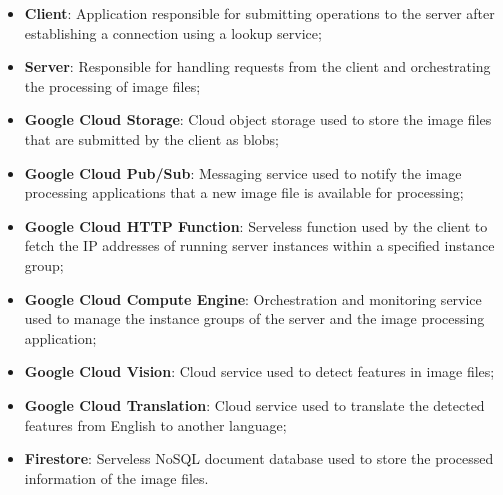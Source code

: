 \begin{itemize}
    \item \textbf{Client}:
    Application responsible for submitting operations to the server after establishing a connection using a lookup service;
    \item \textbf{Server}: Responsible for handling requests from the client and orchestrating the processing of image files;
    \item \textbf{Google Cloud Storage}: Cloud object storage used to store the image files that are submitted by the client as blobs;
    \item \textbf{Google Cloud Pub/Sub}: Messaging service used to notify the image processing applications that a new image file is available for processing;
    \item \textbf{Google Cloud HTTP Function}: Serveless function used by the client to fetch the IP addresses of running server instances within a specified instance group;
    \item \textbf{Google Cloud Compute Engine}: Orchestration and monitoring service used to manage the instance groups of the server and the image processing application;
    \item \textbf{Google Cloud Vision}: Cloud service used to detect features in image files;
    \item \textbf{Google Cloud Translation}: Cloud service used to translate the detected features from English to another language;
    \item \textbf{Firestore}: Serveless NoSQL document database used to store the processed information of the image files.
\end{itemize}
